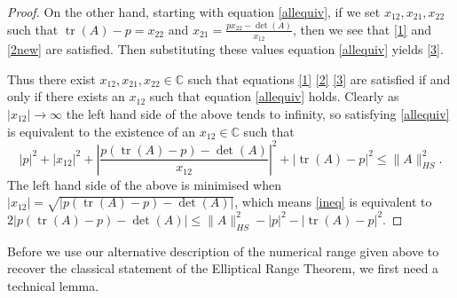 \documentclass[12pt]{article}
\theoremstyle{plain}
\theoremstyle{definition}
\theoremstyle{remark}
\newcommand{\tr}{\operatorname{tr}}
\numberwithin{equation}{section}
\begin{document}
\begin{proof}
On the other hand, starting with equation \eqref{allequiv}, if we set $x_{12}, x_{21}, x_{22}$ such that $\tr(A) - p = x_{22}$ and $x_{21} = \frac{p x_{22} - \det(A)}{x_{12}}$, then we see that \eqref{1} and \eqref{2new} are satisfied. Then substituting these values equation \eqref{allequiv} yields \eqref{3}.

Thus there exist $x_{12}, x_{21}, x_{22} \in \mathbb{C}$ such that equations \eqref{1} \eqref{2} \eqref{3} are satisfied if and only if there exists an $x_{12}$ such that equation \eqref{allequiv} holds. Clearly as $|x_{12}| \rightarrow \infty$ the left hand side of the above tends to infinity, so satisfying \eqref{allequiv} is equivalent to the existence of an $x_{12} \in \mathbb{C}$ such that 
\begin{equation}\label{ineq}
|p|^2 + |x_{12}|^2  + \left|\frac{p(\tr(A)-p) - \det(A)}{x_{12}}\right|^2 +|\tr(A)-p|^2 \leqslant \|A\|_{HS}^2.
\end{equation}
The left hand side of the above is minimised when $|x_{12}|=\sqrt{|p(\tr(A)-p) - \det(A)|}$, which means \eqref{ineq} is equivalent to $2|p(\tr(A)-p) - \det(A)| \leqslant \|A\|_{HS}^2 - |p|^2 -  |\tr(A)-p|^2.$
\end{proof}



Before we use our alternative description of the numerical range given above to recover the classical statement of the Elliptical Range Theorem, we first need a technical lemma.
\end{document}
